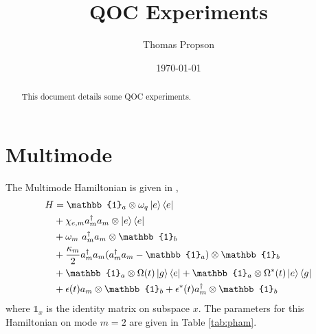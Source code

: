 \documentclass[
  amsfonts,
  amsmath,
  tbtags,
  amssymb,
  aps,
  nobibnotes,
  twocolumn,
  superscriptaddress,
]{revtex4-2}
\begin{document}
\title{QOC Experiments}

\author{Thomas Propson}

\date{\today}

\begin{abstract}
  This document details some QOC experiments.
\end{abstract}

\maketitle

\section{Multimode}
The Multimode Hamiltonian is given in \cite{chakram2020multimode},
\begin{align*}
  H &=  \mathbb{1}_{a} \otimes \omega_{q} \ket{e}\bra{e}\\
  &+ \chi_{e,m} a_{m}^{\dagger}a_{m} \otimes \ket{e}\bra{e}\\
  &+ \omega_{m} \ a_{m}^{\dagger}a_{m} \otimes \mathbb{1}_{b}\\
  &+ \frac{\kappa_{m}}{2} a_{m}^{\dagger} a_{m} (a_{m}^{\dagger}a_{m} - \mathbb{1}_{a}) \otimes \mathbb{1}_{b}\\
  &+ \mathbb{1}_{a} \otimes \Omega(t) \ket{g}\bra{e} +
  \mathbb{1}_{a} \otimes \Omega^{*}(t) \ket{e}\bra{g}\\
  &+ \epsilon(t) a_{m} \otimes \mathbb{1}_{b} + 
  \epsilon^{*}(t) a_{m}^{\dagger} \otimes \mathbb{1}_{b}
\end{align*}
where $\mathbb{1}_{x}$ is the identity matrix
on subspace $x$. The parameters for this Hamiltonian on mode $m = 2$
are given in Table \ref{tab:pham}.
\end{document}
